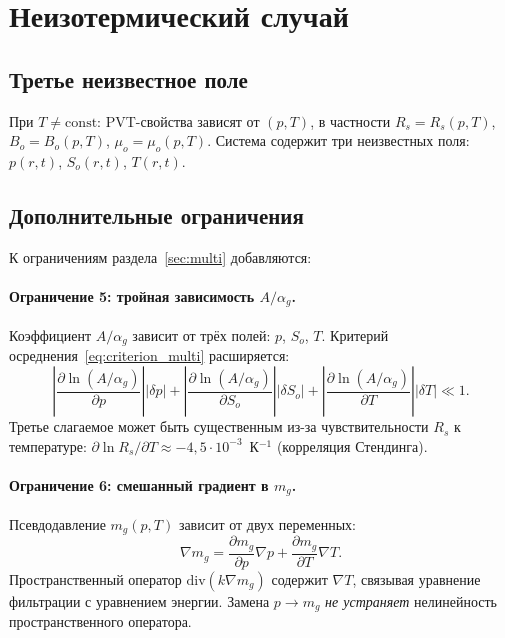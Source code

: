 \documentclass[12pt,a4paper]{article}
\begin{document}
\section{Неизотермический случай}\label{sec:noniso}

\subsection{Третье неизвестное поле}

При $T \neq \mathrm{const}$: PVT-свойства зависят от $(p,T)$,
в частности $R_s = R_s(p,T)$, $B_o = B_o(p,T)$,
$\mu_o = \mu_o(p,T)$. Система содержит три неизвестных поля:
$p(r,t)$, $S_o(r,t)$, $T(r,t)$.

\subsection{Дополнительные ограничения}

К ограничениям раздела~\ref{sec:multi} добавляются:

\paragraph{Ограничение 5: тройная зависимость $A/\alpha_g$.}
Коэффициент $A/\alpha_g$ зависит от трёх полей:
$p$, $S_o$, $T$. Критерий осреднения~\eqref{eq:criterion_multi}
расширяется:
\begin{equation}\label{eq:criterion_T}
  \left|\frac{\partial\ln(A/\alpha_g)}{\partial p}\right|
  |\delta p|
  + \left|\frac{\partial\ln(A/\alpha_g)}{\partial S_o}\right|
  |\delta S_o|
  + \left|\frac{\partial\ln(A/\alpha_g)}{\partial T}\right|
  |\delta T|
  \ll 1.
\end{equation}
Третье слагаемое может быть существенным из-за
чувствительности $R_s$ к температуре:
$\partial\ln R_s/\partial T \approx -4{,}5\cdot10^{-3}$~К$^{-1}$
(корреляция Стендинга).

\paragraph{Ограничение 6: смешанный градиент в $m_g$.}
Псевдодавление $m_g(p,T)$ зависит от двух переменных:
\begin{equation}
  \nabla m_g = \frac{\partial m_g}{\partial p}\nabla p
  + \frac{\partial m_g}{\partial T}\nabla T.
\end{equation}
Пространственный оператор $\mathrm{div}(k\nabla m_g)$
содержит $\nabla T$, связывая уравнение фильтрации
с уравнением энергии. Замена $p \to m_g$ \emph{не устраняет}
нелинейность пространственного оператора.
\end{document}
